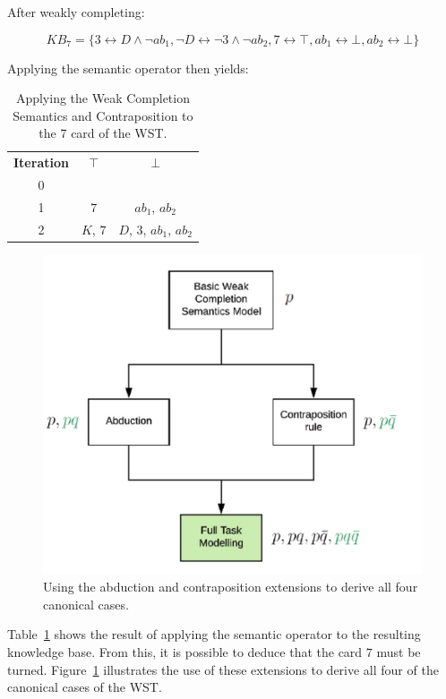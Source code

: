 \documentclass{article}
\begin{document}
After weakly completing:

\[
KB_7 = \{3 \leftrightarrow D \land \lnot ab_1, \lnot D \leftrightarrow \lnot 3 \land \lnot ab_2, 7 \leftrightarrow \top, ab_1 \leftrightarrow \bot, ab_2 \leftrightarrow \bot \}
\]

Applying the semantic operator then yields:

\begin{table}
\begin{center}

\begin{tabular}{ c c c }
 \textbf{Iteration} & \textbf{$\top$} & \textbf{$\bot$} \\ 
 0 &  &  \\  
 1 &  $7$ & $ab_1$, $ab_2$  \\  
 2 &  $K$, $7$ & $D$, $3$, $ab_1$, $ab_2$  
\end{tabular}
\caption{Applying the Weak Completion Semantics and Contraposition to the $7$ card of the WST.}
\label{tbl:7cont}

\end{center}
\end{table}

\begin{figure}
\centering \includegraphics[scale=.6]{wstcano}
\caption{Using the abduction and contraposition extensions to derive all four canonical cases.}
\label{fig:wstcano}
\end{figure}



Table~\ref{tbl:7cont} shows the result of applying the semantic operator to the resulting knowledge base. From this, it is possible to deduce that the card $7$ must be turned. Figure~\ref{fig:wstcano} illustrates the use of these extensions to derive all four of the canonical cases of the WST.
\end{document}

